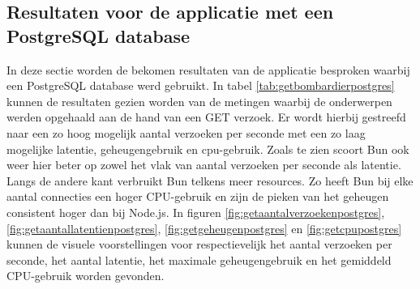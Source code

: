 \subsection{Resultaten voor de applicatie met een PostgreSQL database}
In deze sectie worden de bekomen resultaten van de applicatie besproken waarbij een PostgreSQL database werd gebruikt.
In tabel \ref{tab:getbombardierpostgres} kunnen de resultaten gezien worden van de metingen waarbij de onderwerpen werden opgehaald aan de hand van een GET verzoek.
Er wordt hierbij gestreefd naar een zo hoog mogelijk aantal verzoeken per seconde met een zo laag mogelijke latentie, geheugengebruik en cpu-gebruik.
Zoals te zien scoort Bun ook weer hier beter op zowel het vlak van aantal verzoeken per seconde als latentie.
Langs de andere kant verbruikt Bun telkens meer resources. Zo heeft Bun bij elke aantal connecties een hoger CPU-gebruik en zijn de pieken van het geheugen consistent hoger dan bij Node.js.
In figuren \ref{fig:getaantalverzoekenpostgres}, \ref{fig:getaantallatentienpostgres}, \ref{fig:getgeheugenpostgres} en \ref{fig:getcpupostgres} kunnen de visuele voorstellingen 
voor respectievelijk het aantal verzoeken per seconde, het aantal latentie, het maximale geheugengebruik en het gemiddeld CPU-gebruik worden gevonden.
